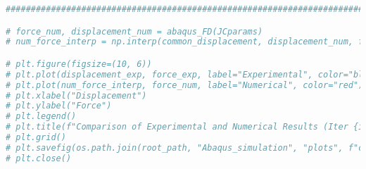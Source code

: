 \documentclass[12pt,a4paper]{article}
\begin{document}
\begin{lstlisting}[language=Python, caption={Optimisation force-déplacement}]
###############################################################################################

# force_num, displacement_num = abaqus_FD(JCparams)
# num_force_interp = np.interp(common_displacement, displacement_num, force_num)

# plt.figure(figsize=(10, 6))
# plt.plot(displacement_exp, force_exp, label="Experimental", color="blue", linestyle='--')
# plt.plot(num_force_interp, force_num, label="Numerical", color="red")
# plt.xlabel("Displacement")
# plt.ylabel("Force")
# plt.legend()
# plt.title(f"Comparison of Experimental and Numerical Results (Iter {i})")
# plt.grid()
# plt.savefig(os.path.join(root_path, "Abaqus_simulation", "plots", f"comparison_iter_{i}.png"))
# plt.close()
\end{lstlisting}
\end{document}
